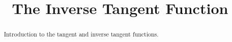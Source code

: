 \documentclass{ximera}
\title{The Inverse Tangent Function}
\begin{document}
\begin{abstract}
Introduction to the tangent and inverse tangent functions.
\end{abstract}
\maketitle
\end{document}
